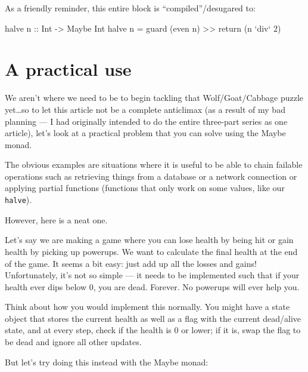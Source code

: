 \documentclass[]{article}
\newenvironment{Shaded}{}{}
\newcommand{\DataTypeTok}[1]{\textcolor[rgb]{0.56,0.13,0.00}{{#1}}}
\newcommand{\DecValTok}[1]{\textcolor[rgb]{0.25,0.63,0.44}{{#1}}}
\newcommand{\OtherTok}[1]{\textcolor[rgb]{0.00,0.44,0.13}{{#1}}}
\newcommand{\FunctionTok}[1]{\textcolor[rgb]{0.02,0.16,0.49}{{#1}}}
\newcommand{\NormalTok}[1]{{#1}}
\begin{document}
As a friendly reminder, this entire block is ``compiled''/desugared to:

\begin{Shaded}
\begin{Highlighting}[]
\NormalTok{halve}\OtherTok{ n ::} \DataTypeTok{Int} \OtherTok{->} \DataTypeTok{Maybe} \DataTypeTok{Int}
\NormalTok{halve n }\FunctionTok{=} \NormalTok{guard (even n) }\FunctionTok{>>} \NormalTok{return (n }\OtherTok{`div`} \DecValTok{2}\NormalTok{)}
\end{Highlighting}
\end{Shaded}

\section{A practical use}\label{a-practical-use}

We aren't where we need to be to begin tackling that Wolf/Goat/Cabbage
puzzle yet\ldots{}so to let this article not be a complete anticlimax
(as a result of my bad planning --- I had originally intended to do the
entire three-part series as one article), let's look at a practical
problem that you can solve using the Maybe monad.

The obvious examples are situations where it is useful to be able to
chain failable operations such as retrieving things from a database or a
network connection or applying partial functions (functions that only
work on some values, like our \texttt{halve}).

However, here is a neat one.

Let's say we are making a game where you can lose health by being hit or
gain health by picking up powerups. We want to calculate the final
health at the end of the game. It seems a bit easy: just add up all the
losses and gains! Unfortunately, it's not so simple --- it needs to be
implemented such that if your health ever dips below 0, you are dead.
Forever. No powerups will ever help you.

Think about how you would implement this normally. You might have a
state object that stores the current health as well as a flag with the
current dead/alive state, and at every step, check if the health is 0 or
lower; if it is, swap the flag to be dead and ignore all other updates.

But let's try doing this instead with the Maybe monad:
\end{document}
